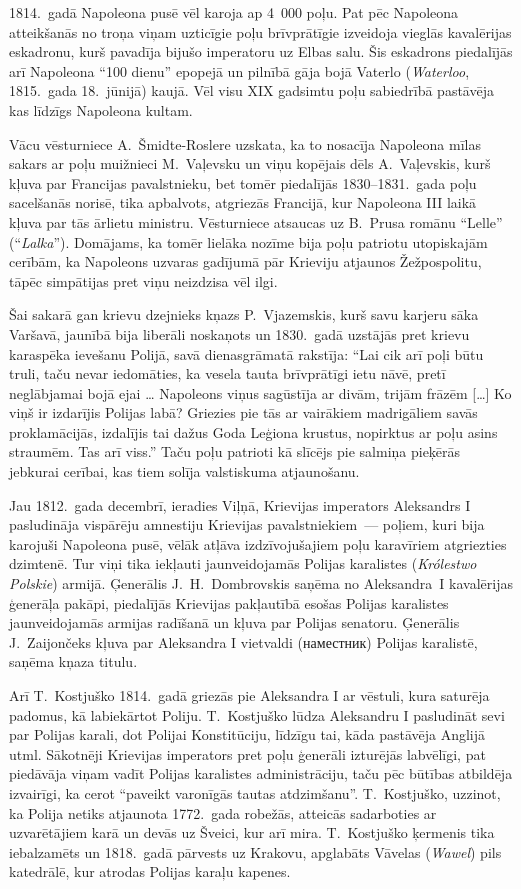 \documentclass[twoside,a5paper,12pt,fleqn,openany]{extbook}
\newcommand{\pltxti}[1]{\textit{\textpolish{#1}}}
\newcommand{\rutxti}[1]{\textrussian{#1}}
\newcommand{\entxti}[1]{\textit{\textenglish{#1}}}
\newcommand{\citespace}{[\dots{}]}
\begin{document}
1814.~gadā Napoleona pusē vēl karoja ap 4~000 poļu. Pat pēc Napoleona atteikšanās no troņa viņam uzticīgie poļu brīvprātīgie izveidoja vieglās kavalērijas eskadronu, kurš pavadīja bijušo imperatoru uz Elbas salu. Šis eskadrons piedalījās arī Napoleona ``100 dienu'' epopejā un pilnībā gāja bojā Vaterlo (\entxti{Waterloo}, 1815.~gada 18.~jūnijā) kaujā. Vēl visu XIX gadsimtu poļu sabiedrībā pastāvēja kas līdzīgs Napoleona kultam.

Vācu vēsturniece A.~Šmidte-Roslere uzskata, ka to nosacīja Napoleona mīlas sakars ar poļu muižnieci M.~Vaļevsku un viņu kopējais dēls A.~Vaļevskis, kurš kļuva par Francijas pavalstnieku, bet tomēr piedalījās 1830--1831.~gada poļu sacelšanās norisē, tika apbalvots, atgriezās Francijā, kur Napoleona III laikā kļuva par tās ārlietu ministru. Vēsturniece atsaucas uz B.~Prusa romānu ``Lelle'' (``\pltxti{Lalka}''). Domājams, ka tomēr lielāka nozīme bija poļu patriotu utopiskajām cerībām, ka Napoleons uzvaras gadījumā pār Krieviju atjaunos Žežpospolitu, tāpēc simpātijas pret viņu neizdzisa vēl ilgi.

Šai sakarā gan krievu dzejnieks kņazs P.~Vjazemskis, kurš savu karjeru sāka Varšavā, jaunībā bija liberāli noskaņots un 1830.~gadā uzstājās pret krievu karaspēka ievešanu Polijā, savā dienasgrāmatā rakstīja: ``Lai cik arī poļi būtu truli, taču nevar iedomāties, ka vesela tauta brīvprātīgi ietu nāvē, pretī neglābjamai bojā ejai \dots{} Napoleons viņus sagūstīja ar divām, trijām frāzēm \citespace{} Ko viņš ir izdarījis Polijas labā? Griezies pie tās ar vairākiem madrigāliem savās proklamācijās, izdalījis tai dažus Goda Leģiona krustus, nopirktus ar poļu asins straumēm. Tas arī viss.'' Taču poļu patrioti kā slīcējs pie salmiņa pieķērās jebkurai cerībai, kas tiem solīja valstiskuma atjaunošanu.

Jau 1812.~gada decembrī, ieradies Viļņā, Krievijas imperators Aleksandrs I pasludināja vispārēju amnestiju Krievijas pavalstniekiem~--- poļiem, kuri bija karojuši Napoleona pusē, vēlāk atļāva izdzīvojušajiem poļu karavīriem atgriezties dzimtenē. Tur viņi tika iekļauti jaunveidojamās Polijas karalistes (\pltxti{Królestwo Polskie}) armijā. Ģenerālis J.~H.~Dombrovskis saņēma no Aleksandra~I kavalērijas ģenerāļa pakāpi, piedalījās Krievijas pakļautībā esošas Polijas karalistes jaunveidojamās armijas radīšanā un kļuva par Polijas senatoru. Ģenerālis J.~Zaijončeks kļuva par Aleksandra I vietvaldi (\rutxti{наместник}) Polijas karalistē, saņēma kņaza titulu.

Arī T.~Kostjuško 1814.~gadā griezās pie Aleksandra I ar vēstuli, kura saturēja padomus, kā labiekārtot Poliju. T.~Kostjuško lūdza Aleksandru I pasludināt sevi par Polijas karali, dot Polijai Konstitūciju, līdzīgu tai, kāda pastāvēja Anglijā utml. Sākotnēji Krievijas imperators pret poļu ģenerāli izturējās labvēlīgi, pat piedāvāja viņam vadīt Polijas karalistes administrāciju, taču pēc būtības atbildēja izvairīgi, ka cerot ``paveikt varonīgās tautas atdzimšanu''. T.~Kostjuško, uzzinot, ka Polija netiks atjaunota 1772.~gada robežās, atteicās sadarboties ar uzvarētājiem karā un devās uz Šveici, kur arī mira. T.~Kostjuško ķermenis tika iebalzamēts un 1818.~gadā pārvests uz Krakovu, apglabāts Vāvelas (\pltxti{Wawel}) pils katedrālē, kur atrodas Polijas karaļu kapenes.
\end{document}
